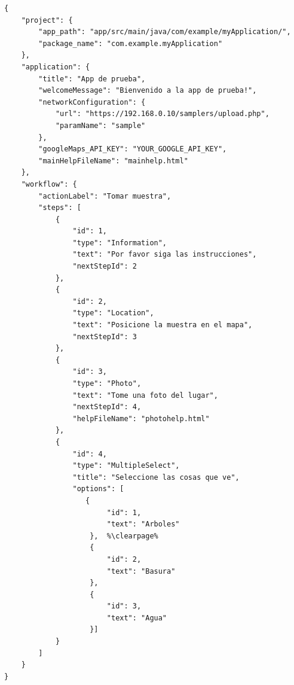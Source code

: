 \clearpage
\begin{lstlisting}[language=XML, escapechar=\%, frame=tlbr, label={codigo:app_ejemplo}, caption=Ejemplo de un archivo de configuración para Samplers.]
{
	"project": {
		"app_path": "app/src/main/java/com/example/myApplication/",
		"package_name": "com.example.myApplication"
	},
	"application": {
		"title": "App de prueba",
		"welcomeMessage": "Bienvenido a la app de prueba!",
		"networkConfiguration": {
			"url": "https://192.168.0.10/samplers/upload.php",
			"paramName": "sample"
		},
		"googleMaps_API_KEY": "YOUR_GOOGLE_API_KEY",
		"mainHelpFileName": "mainhelp.html"
	},
	"workflow": {
		"actionLabel": "Tomar muestra",
		"steps": [
			{
				"id": 1,
				"type": "Information",
				"text": "Por favor siga las instrucciones",
				"nextStepId": 2
			}, 
			{
				"id": 2,
				"type": "Location",
				"text": "Posicione la muestra en el mapa",
				"nextStepId": 3
			}, 
			{
				"id": 3,
				"type": "Photo",
				"text": "Tome una foto del lugar",
				"nextStepId": 4,
				"helpFileName": "photohelp.html"
			},
			{
				"id": 4,
				"type": "MultipleSelect",
				"title": "Seleccione las cosas que ve",
				"options": [
				   {
						"id": 1,
						"text": "Arboles"
					},  %\clearpage%
					{
						"id": 2,
						"text": "Basura"
					}, 
					{
						"id": 3,
						"text": "Agua"
					}]
			}
		]
	}
}
\end{lstlisting}


